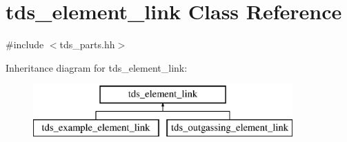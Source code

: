 \hypertarget{classtds__element__link}{}\section{tds\+\_\+element\+\_\+link Class Reference}
\label{classtds__element__link}


{\ttfamily \#include $<$tds\+\_\+parts.\+hh$>$}

Inheritance diagram for tds\+\_\+element\+\_\+link\+:\begin{figure}[H]
\begin{center}
\leavevmode
\includegraphics[height=2.000000cm]{classtds__element__link}
\end{center}
\end{figure}
